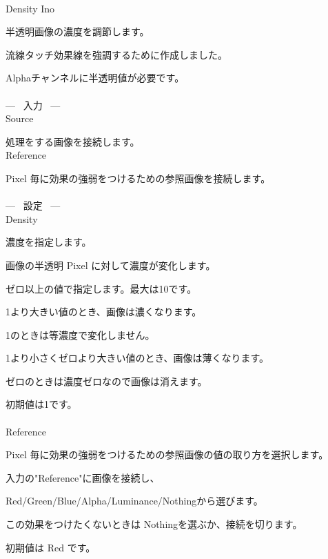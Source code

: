 \documentclass[a4paper,12pt]{article}
\begin{document}
\thispagestyle{empty}

\Large
\noindent \\
Density Ino\medskip
\par
\normalsize
半透明画像の濃度を調節します。\par
流線タッチ効果線を強調するために作成しました。\par
Alphaチャンネルに半透明値が必要です。\\
\\
--- \ 入力 \ ---\\
Source\par
処理をする画像を接続します。\\
Reference\par
Pixel 毎に効果の強弱をつけるための参照画像を接続します。\\
\\
--- \ 設定 \ ---\\
Density\par
濃度を指定します。\par
画像の半透明 Pixel に対して濃度が変化します。\par
ゼロ以上の値で指定します。最大は10です。\par
1より大きい値のとき、画像は濃くなります。\par
1のときは等濃度で変化しません。\par
1より小さくゼロより大きい値のとき、画像は薄くなります。\par
ゼロのときは濃度ゼロなので画像は消えます。\par
初期値は1です。\\
\\
Reference\par
Pixel 毎に効果の強弱をつけるための参照画像の値の取り方を選択します。\par
入力の"Reference"に画像を接続し、\par
Red/Green/Blue/Alpha/Luminance/Nothingから選びます。\par
この効果をつけたくないときは Nothingを選ぶか、接続を切ります。\par
初期値は Red です。
\end{document}
